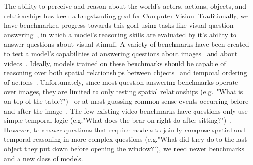 The ability to perceive and reason about the world's actors, actions, objects, and relationships has been a longstanding goal for Computer Vision. 
Traditionally, we have benchmarked progress towards this goal using tasks like visual question answering~\cite{antol2015vqa}, in which a model's reasoning skills are evaluated by it's ability to answer questions about visual stimuli. 
A variety of benchmarks have been created to test a model's capabilities at answering questions about images~\cite{johnson2017clevr,hudson2019gqa,antol2015vqa,zellers2019recognition,goyal2017making,krishna2017visual,zhu2016visual7w,kim2020answering} and about videos~\cite{tapaswi2016movieqa,lei2018tvqa,jang2017tgif,kim2017deepstory,xu2017video,maharaj2017dataset,zeng2016leveraging,yu2019activitynet, yi2019clevrer, mun2017marioqa}. 
Ideally, models trained on these benchmarks should be capable of reasoning over both spatial relationships between objects~\cite{krishna2017visual,lu2016visual} and temporal ordering of actions~\cite{zacks2001events,ji2020action}. 
Unfortunately, since most question-answering benchmarks operate over images, they are limited to only testing spatial relationships (e.g.~"What is on top of the table?")~\cite{hudson2019gqa,krishna2017visual,antol2015vqa} or at most guessing common sense events occurring before and after the image~\cite{park2020visualcomet,zellers2019recognition}. 
The few existing video benchmarks have questions only use simple temporal logic (e.g."What does the bear on right do after sitting?")~\cite{jang2017tgif,xu2017video,maharaj2017dataset,zeng2016leveraging,yu2019activitynet}. 
However, to answer questions that require models to jointly compose spatial and temporal reasoning in more complex questions (e.g."What did they do to the last object they put down before opening the window?"), we need newer benchmarks and a new class of models.


